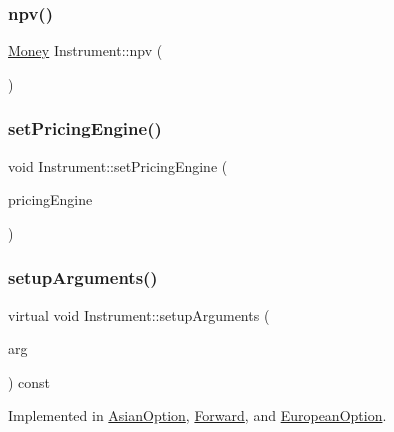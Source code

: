 \subsubsection{\texorpdfstring{npv()}{npv()}}
{\footnotesize\ttfamily \hyperlink{_name_def_8h_a5a9d48c16a694e9a2d9f1eca730dc8c5}{Money} Instrument\+::npv (\begin{DoxyParamCaption}{ }\end{DoxyParamCaption})}

\hypertarget{class_instrument_a47bdaa9390ab5e0616e8499a507c50cd}{}\label{class_instrument_a47bdaa9390ab5e0616e8499a507c50cd} 
\subsubsection{\texorpdfstring{set\+Pricing\+Engine()}{setPricingEngine()}}
{\footnotesize\ttfamily void Instrument\+::set\+Pricing\+Engine (\begin{DoxyParamCaption}\item[{const std\+::shared\+\_\+ptr$<$ \hyperlink{class_pricing_engine}{Pricing\+Engine} $>$}]{pricing\+Engine }\end{DoxyParamCaption})}

\hypertarget{class_instrument_ac0f78fd32a360abde0c31b5bc01c7e67}{}\label{class_instrument_ac0f78fd32a360abde0c31b5bc01c7e67} 
\subsubsection{\texorpdfstring{setup\+Arguments()}{setupArguments()}}
{\footnotesize\ttfamily virtual void Instrument\+::setup\+Arguments (\begin{DoxyParamCaption}\item[{\hyperlink{class_pricing_engine_1_1_arguments}{Pricing\+Engine\+::\+Arguments} $\ast$}]{arg }\end{DoxyParamCaption}) const\hspace{0.3cm}{\ttfamily [pure virtual]}}



Implemented in \hyperlink{class_asian_option_a475cbd83529df369b371ee44f63cdd08}{Asian\+Option}, \hyperlink{class_forward_ad6208ba4ee03c396e611c142be735b26}{Forward}, and \hyperlink{class_european_option_a94c1826feba0099400bce8dd6fc01cb9}{European\+Option}.



